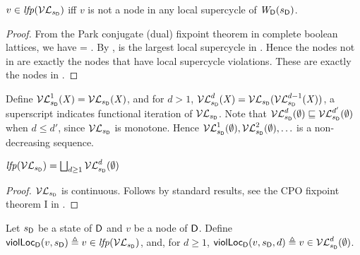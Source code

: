 \begin{proposition} \label{prop:LFPisLocScViolations}
$v \in \mathit{lfp}(\mathcal{VL}_{s_\mathsf{D}})$ iff $v$ is not a node in any local supercycle of $\mathit{W}_{\mathsf{D}}({s_\mathsf{D}})$.
\end{proposition}
%
\begin{proof}
From the Park conjugate (dual) fixpoint theorem in complete boolean lattices, we have 
\lfp{\VFsymb_{\sD}} = \complLoc{\gfp{\SFsymb_{\sD}}}.
By , \gfp{\SFsymb_{\sD}} is the largest local supercycle in . Hence the nodes not in 
\gfp{\SFsymb_{\sD}} are exactly the nodes that have local supercycle violations. These are exactly the nodes in \lfp{\VFsymb_{\sD}}.
\end{proof}

Define $\mathcal{VL}_{s_\mathsf{D}}^{1}(\mathit{X}) = \mathcal{VL}_{s_\mathsf{D}}(\mathit{X})$, and for $d > 1$, 
$\mathcal{VL}_{s_\mathsf{D}}^{d}(\mathit{X}) = \mathcal{VL}_{s_\mathsf{D}}(\mathcal{VL}_{s_\mathsf{D}}^{d-1}(\mathit{X}))$, \ie a superscript indicates functional iteration of $\mathcal{VL}_{s_\mathsf{D}}$. Note that 
$\mathcal{VL}_{s_\mathsf{D}}^{d}(\emptyset) \sqsubseteq \mathcal{VL}_{s_\mathsf{D}}^{d'}(\emptyset)$ when $d \le d'$, since $\mathcal{VL}_{s_\mathsf{D}}$ is monotone.
Hence $\mathcal{VL}_{s_\mathsf{D}}^{1}(\emptyset), \mathcal{VL}_{s_\mathsf{D}}^{2}(\emptyset), \ldots$ is a non-decreasing sequence.

\begin{proposition} \label{prop:computeLocLFP}
$\mathit{lfp}(\mathcal{VL}_{s_\mathsf{D}}) = \bigsqcup_{d \ge 1} \mathcal{VL}_{s_\mathsf{D}}^{d}(\emptyset)$ 
\end{proposition}
%
\begin{proof}
$\mathcal{VL}_{s_\mathsf{D}}$ is continuous. Follows by standard results, \eg see the CPO fixpoint theorem I in 
\cite{DP02}.
\end{proof}










\begin{definition}
\label{def:supercycle.violation.local}
\label{defn:supercycle.violation.local}
Let $s_\mathsf{D}$ be a state of $\mathsf{D}$ and $v$ be a node of $\mathsf{D}$.
Define 
$\mathsf{violLoc}_{\mathsf{D}}(v,s_\mathsf{D}) \triangleq v \in \mathit{lfp}(\mathcal{VL}_{s_\mathsf{D}})$,
and, for $d \ge 1$, $\mathsf{violLoc}_{\mathsf{D}}(v,s_\mathsf{D},d) \triangleq v \in  \mathcal{VL}_{s_\mathsf{D}}^{d}(\emptyset)$.
\end{definition}



